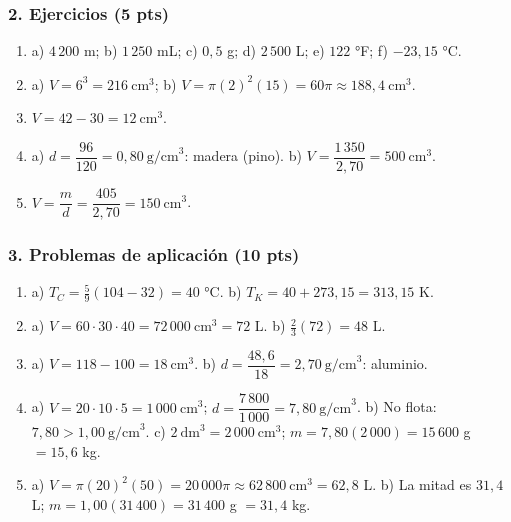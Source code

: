 \documentclass[12pt, letterpaper]{article}
\begin{document}
\subsubsection*{2. Ejercicios (5 pts)}
\begin{enumerate}[leftmargin=*, label=\textbf{\arabic*.}, itemsep=0.35em]
  \item a) $4\,200$ m; \quad b) $1\,250$ mL; \quad c) $0{,}5$ g; \quad
        d) $2\,500$ L; \quad e) $122$ °F; \quad f) $-23{,}15$ °C.
  \item a) $V=6^3=216\ \text{cm}^3$; \quad
        b) $V=\pi(2)^2(15)=60\pi\approx188{,}4\ \text{cm}^3$.
  \item $V=42-30=12\ \text{cm}^3$.
  \item a) $d=\dfrac{96}{120}=0{,}80\ \text{g/cm}^3$: madera (pino). \quad
        b) $V=\dfrac{1\,350}{2{,}70}=500\ \text{cm}^3$.
  \item $V=\dfrac{m}{d}=\dfrac{405}{2{,}70}=150\ \text{cm}^3$.
\end{enumerate}

\subsubsection*{3. Problemas de aplicación (10 pts)}
\begin{enumerate}[leftmargin=*, label=\textbf{\arabic*.}, itemsep=0.35em]
  \item a) $T_C=\frac{5}{9}(104-32)=40$ °C. \quad
        b) $T_K=40+273{,}15=313{,}15$ K.
  \item a) $V=60\cdot30\cdot40=72\,000\ \text{cm}^3=72$ L. \quad
        b) $\frac{2}{3}(72)=48$ L.
  \item a) $V=118-100=18\ \text{cm}^3$. \quad
        b) $d=\dfrac{48{,}6}{18}=2{,}70\ \text{g/cm}^3$: aluminio.
  \item a) $V=20\cdot10\cdot5=1\,000\ \text{cm}^3$;
        $d=\dfrac{7\,800}{1\,000}=7{,}80\ \text{g/cm}^3$. \quad
        b) No flota: $7{,}80>1{,}00\ \text{g/cm}^3$. \quad
        c) $2\ \text{dm}^3=2\,000\ \text{cm}^3$;
        $m=7{,}80(2\,000)=15\,600$ g $=15{,}6$ kg.
  \item a) $V=\pi(20)^2(50)=20\,000\pi\approx62\,800\ \text{cm}^3=62{,}8$ L. \quad
        b) La mitad es $31{,}4$ L; $m=1{,}00(31\,400)=31\,400$ g $=31{,}4$ kg.
\end{enumerate}

\fi
\end{document}
